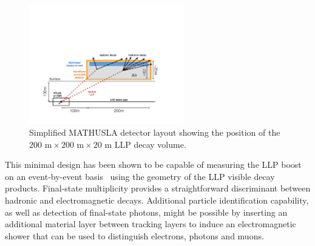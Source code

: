 \begin{figure}
\begin{center}
\includegraphics[width=0.6\textwidth]{figures/mathusla/3_mathusla.pdf}
\end{center}
\caption{
Simplified MATHUSLA detector layout showing the position of the $200\,\,\mathrm{m} \times 200\,\,\mathrm{m} \times 20\,\,\mathrm{m}$ LLP decay volume.
}
\label{f.mathuslalayout}
\end{figure}


This minimal design has been shown to be capable of measuring the LLP boost  on an event-by-event basis~\cite{Curtin:2017izq} using  the geometry of the LLP visible decay products. Final-state multiplicity provides a straightforward discriminant between hadronic and electromagnetic decays. Additional particle identification capability, as well as detection of final-state photons, might be possible by inserting an additional material layer between tracking layers to induce an electromagnetic shower that can be used to distinguish electrons, photons and muons.


